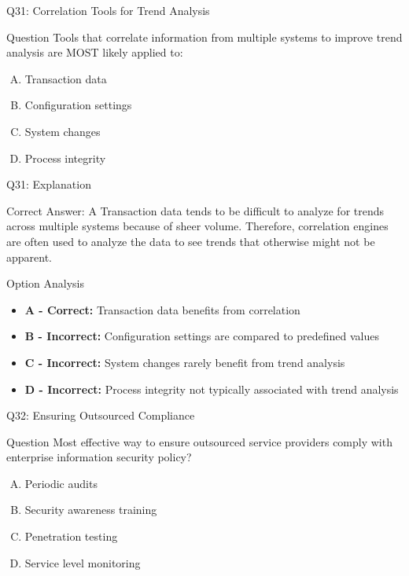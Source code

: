 \documentclass{beamer}
\begin{document}
	\begin{frame}{Q31: Correlation Tools for Trend Analysis}
		\begin{block}{Question}
			Tools that correlate information from multiple systems to improve trend analysis are MOST likely applied to:
		\end{block}
		\begin{enumerate}[(A)]
			\item Transaction data
			\item Configuration settings
			\item System changes
			\item Process integrity
		\end{enumerate}
	\end{frame}
	
	\begin{frame}{Q31: Explanation}
		\begin{block}{Correct Answer: A}
			Transaction data tends to be difficult to analyze for trends across multiple systems because of sheer volume. Therefore, correlation engines are often used to analyze the data to see trends that otherwise might not be apparent.
		\end{block}
		\begin{block}{Option Analysis}
			\begin{itemize}
				\item \textbf{A - Correct:} Transaction data benefits from correlation
				\item \textbf{B - Incorrect:} Configuration settings are compared to predefined values
				\item \textbf{C - Incorrect:} System changes rarely benefit from trend analysis
				\item \textbf{D - Incorrect:} Process integrity not typically associated with trend analysis
			\end{itemize}
		\end{block}
	\end{frame}
	
	\begin{frame}{Q32: Ensuring Outsourced Compliance}
		\begin{block}{Question}
			Most effective way to ensure outsourced service providers comply with enterprise information security policy?
		\end{block}
		\begin{enumerate}[(A)]
			\item Periodic audits
			\item Security awareness training
			\item Penetration testing
			\item Service level monitoring
		\end{enumerate}
	\end{frame}
	
\end{document}
